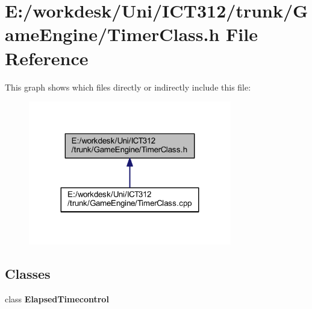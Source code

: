 \section{E\+:/workdesk/\+Uni/\+I\+C\+T312/trunk/\+Game\+Engine/\+Timer\+Class.h File Reference}
\label{_timer_class_8h}
This graph shows which files directly or indirectly include this file\+:\nopagebreak
\begin{figure}[H]
\begin{center}
\leavevmode
\includegraphics[width=251pt]{db/ddf/_timer_class_8h__dep__incl}
\end{center}
\end{figure}
\subsection*{Classes}
\begin{DoxyCompactItemize}
\item 
class {\bf Elapsed\+Timecontrol}
\end{DoxyCompactItemize}
